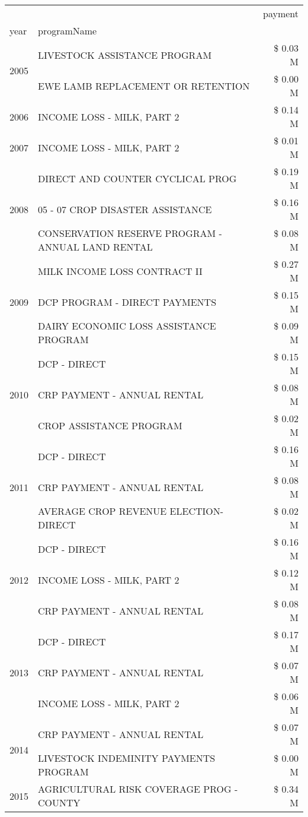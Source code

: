 \begin{tabular}{llr}
\toprule
 &  & payment \\
year & programName &  \\
\midrule
\multirow[t]{2}{*}{2005} & LIVESTOCK ASSISTANCE PROGRAM & \$ 0.03 M \\
 & EWE LAMB REPLACEMENT OR RETENTION & \$ 0.00 M \\
\cline{1-3}
2006 & INCOME LOSS - MILK, PART 2 & \$ 0.14 M \\
\cline{1-3}
2007 & INCOME LOSS - MILK, PART 2 & \$ 0.01 M \\
\cline{1-3}
\multirow[t]{3}{*}{2008} & DIRECT AND COUNTER CYCLICAL PROG & \$ 0.19 M \\
 & 05 - 07 CROP DISASTER ASSISTANCE & \$ 0.16 M \\
 & CONSERVATION RESERVE PROGRAM - ANNUAL LAND RENTAL & \$ 0.08 M \\
\cline{1-3}
\multirow[t]{3}{*}{2009} & MILK INCOME LOSS CONTRACT II & \$ 0.27 M \\
 & DCP PROGRAM - DIRECT PAYMENTS & \$ 0.15 M \\
 & DAIRY ECONOMIC LOSS ASSISTANCE PROGRAM & \$ 0.09 M \\
\cline{1-3}
\multirow[t]{3}{*}{2010} & DCP - DIRECT & \$ 0.15 M \\
 & CRP PAYMENT - ANNUAL RENTAL & \$ 0.08 M \\
 & CROP ASSISTANCE PROGRAM & \$ 0.02 M \\
\cline{1-3}
\multirow[t]{3}{*}{2011} & DCP - DIRECT & \$ 0.16 M \\
 & CRP PAYMENT - ANNUAL RENTAL & \$ 0.08 M \\
 & AVERAGE CROP REVENUE ELECTION-DIRECT & \$ 0.02 M \\
\cline{1-3}
\multirow[t]{3}{*}{2012} & DCP - DIRECT & \$ 0.16 M \\
 & INCOME LOSS - MILK, PART 2 & \$ 0.12 M \\
 & CRP PAYMENT - ANNUAL RENTAL & \$ 0.08 M \\
\cline{1-3}
\multirow[t]{3}{*}{2013} & DCP - DIRECT & \$ 0.17 M \\
 & CRP PAYMENT - ANNUAL RENTAL & \$ 0.07 M \\
 & INCOME LOSS - MILK, PART 2 & \$ 0.06 M \\
\cline{1-3}
\multirow[t]{2}{*}{2014} & CRP PAYMENT - ANNUAL RENTAL & \$ 0.07 M \\
 & LIVESTOCK INDEMINITY PAYMENTS PROGRAM & \$ 0.00 M \\
\cline{1-3}
\multirow[t]{3}{*}{2015} & AGRICULTURAL RISK COVERAGE PROG - COUNTY & \$ 0.34 M \\

\end{tabular}
